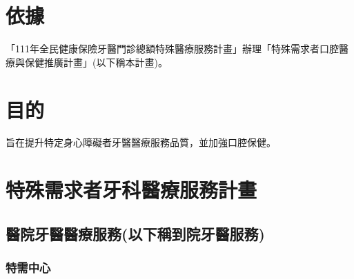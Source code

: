 \section{依據}
「111年全民健康保險牙醫門診總額特殊醫療服務計畫」辦理「特殊需求者口腔醫療與保健推廣計畫」(以下稱本計畫)。

\section{目的} 旨在提升特定身心障礙者牙醫醫療服務品質，並加強口腔保健。

\section{特殊需求者牙科醫療服務計畫}

\subsection{醫院牙醫醫療服務(以下稱到院牙醫服務)}
\label{dent}

\subsubsection{特需中心}

